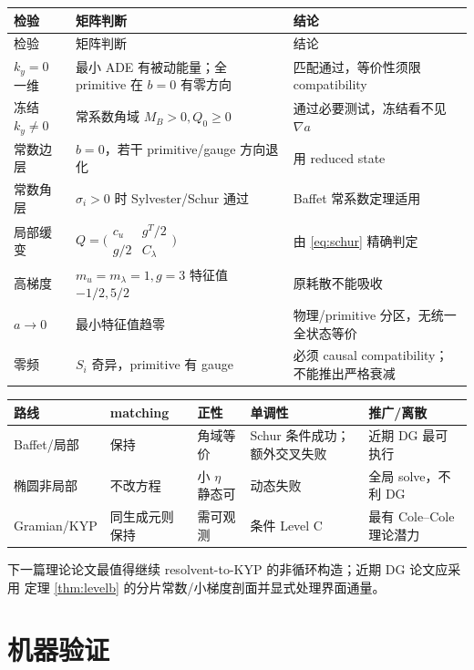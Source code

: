 \documentclass[UTF8,a4paper,11pt]{ctexart}
\begin{document}
\begin{longtable}{p{}p{}p{}}
\toprule 检验&矩阵判断&结论\\ \midrule\endfirsthead
\toprule 检验&矩阵判断&结论\\ \midrule\endhead
$k_y=0$ 一维&最小 ADE 有被动能量；全 primitive 在 $b=0$ 有零方向&匹配通过，等价性须限 compatibility\\
冻结 $k_y\ne0$&常系数角域 $M_B>0,Q_0\ge0$&通过必要测试，冻结看不见 $\nabla a$\\
常数边层&$b=0$，若干 primitive/gauge 方向退化&用 reduced state\\
常数角层&$\sigma_i>0$ 时 Sylvester/Schur 通过&Baffet 常系数定理适用\\
局部缓变&$Q=\bigl(\begin{smallmatrix}c_u&g^T/2\\g/2&C_\lambda\end{smallmatrix}\bigr)$&由 \eqref{eq:schur} 精确判定\\
高梯度&$m_u=m_\lambda=1,g=3$ 特征值 $-1/2,5/2$&原耗散不能吸收\\
$a\to0$&最小特征值趋零&物理/primitive 分区，无统一全状态等价\\
零频&$S_i$ 奇异，primitive 有 gauge&必须 causal compatibility；不能推出严格衰减\\
\bottomrule
\end{longtable}

\begin{center}
\begin{tabular}{p{}p{}p{}p{}p{}}
\toprule 路线&matching&正性&单调性&推广/离散\\ \midrule
Baffet/局部&保持&角域等价&Schur 条件成功；额外交叉失败&近期 DG 最可执行\\
椭圆非局部&不改方程&小 $\eta$ 静态可&动态失败&全局 solve，不利 DG\\
Gramian/KYP&同生成元则保持&需可观测&条件 Level C&最有 Cole--Cole 理论潜力\\
\bottomrule
\end{tabular}
\end{center}

下一篇理论论文最值得继续 resolvent-to-KYP 的非循环构造；近期 DG 论文应采用
定理 \ref{thm:levelb} 的分片常数/小梯度剖面并显式处理界面通量。

\section{机器验证}
\end{document}
